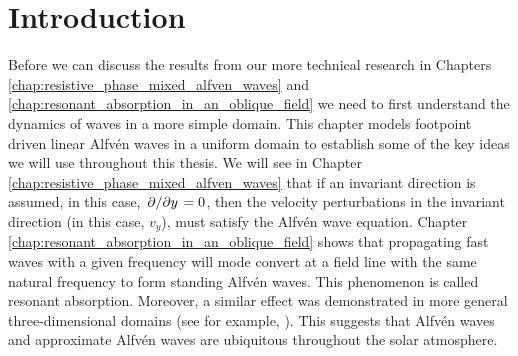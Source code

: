 \section{Introduction}

Before we can discuss the results from our more technical research in Chapters \ref{chap:resistive_phase_mixed_alfven_waves} and \ref{chap:resonant_absorption_in_an_oblique_field} we need to first understand the dynamics of waves in a more simple domain.
This chapter models footpoint driven linear Alfv\'en waves in a uniform domain to establish some of the key ideas we will use throughout this thesis.
We will see in Chapter \ref{chap:resistive_phase_mixed_alfven_waves} that if an invariant direction is assumed, in this case, $\pdv*{}{y}=0$, then the velocity perturbations in the invariant direction (in this case, $v_y$), must satisfy the Alfv\'en wave equation. Chapter \ref{chap:resonant_absorption_in_an_oblique_field} shows that propagating fast waves with a given frequency will mode convert at a field line with the same natural frequency to form standing Alfv\'en waves. This phenomenon is called resonant absorption. Moreover, a similar effect was demonstrated in more general three-dimensional domains (see for example, \citealt{Wright2016,Elsden2017,Elsden2018}). This suggests that Alfv\'en waves and approximate Alfv\'en waves are ubiquitous throughout the solar atmosphere.

